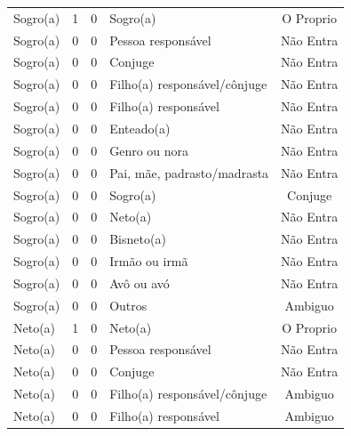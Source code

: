 \documentclass[
	12pt,				%
	openright,			%
	twoside,			%
	a4paper,			%
	english,			%
	french,				%
	spanish,			%
	brazil				%
	]{abntex2}
\begin{document}
\begin{anexosenv}
\begin{longtable}{@{}lcclc@{}}
Sogro(a)                     & 1         & 0        & Sogro(a)                     & O Proprio       \\
Sogro(a)                     & 0         & 0        & Pessoa responsável           & Não Entra       \\
Sogro(a)                     & 0         & 0        & Conjuge                      & Não Entra       \\
Sogro(a)                     & 0         & 0        & Filho(a) responsável/cônjuge & Não Entra       \\
Sogro(a)                     & 0         & 0        & Filho(a) responsável         & Não Entra       \\
Sogro(a)                     & 0         & 0        & Enteado(a)                   & Não Entra       \\
Sogro(a)                     & 0         & 0        & Genro ou nora                & Não Entra       \\
Sogro(a)                     & 0         & 0        & Pai, mãe, padrasto/madrasta  & Não Entra       \\
Sogro(a)                     & 0         & 0        & Sogro(a)                     & Conjuge         \\
Sogro(a)                     & 0         & 0        & Neto(a)                      & Não Entra       \\
Sogro(a)                     & 0         & 0        & Bisneto(a)                   & Não Entra       \\
Sogro(a)                     & 0         & 0        & Irmão ou irmã                & Não Entra       \\
Sogro(a)                     & 0         & 0        & Avô ou avó                   & Não Entra       \\
Sogro(a)                     & 0         & 0        & Outros                       & Ambiguo         \\
Neto(a)                      & 1         & 0        & Neto(a)                      & O Proprio       \\
Neto(a)                      & 0         & 0        & Pessoa responsável           & Não Entra       \\
Neto(a)                      & 0         & 0        & Conjuge                      & Não Entra       \\
Neto(a)                      & 0         & 0        & Filho(a) responsável/cônjuge & Ambiguo         \\
Neto(a)                      & 0         & 0        & Filho(a) responsável         & Ambiguo         \\

\end{longtable}
\end{anexosenv}
\end{document}
